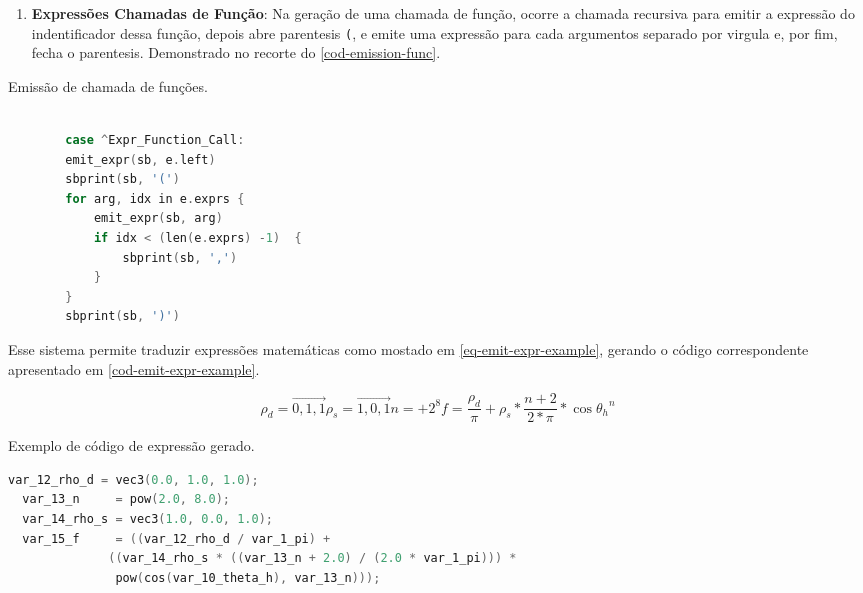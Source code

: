 \begin{enumerate}
    \item \textbf{Expressões Chamadas de Função}:
        Na geração de uma chamada de função, ocorre a chamada recursiva para emitir a expressão do indentificador dessa função, depois abre parentesis \verb"(", e emite uma expressão para cada argumentos separado por virgula e, por fim, fecha o parentesis. Demonstrado no recorte do \autoref{cod-emission-func}.

\end{enumerate}

\begin{codigo}[htb]
    \caption{\small Emissão de chamada de funções. }
    \label{cod-emission-func}
\begin{lstlisting}[language=C, frame=none, inputencoding=utf8]

        case ^Expr_Function_Call:
        emit_expr(sb, e.left)
        sbprint(sb, '(')
        for arg, idx in e.exprs {
            emit_expr(sb, arg)
            if idx < (len(e.exprs) -1)  {
                sbprint(sb, ',')
            }
        }
        sbprint(sb, ')')
\end{lstlisting}
\end{codigo}


 Esse sistema permite traduzir expressões matemáticas como mostado em \autoref{eq-emit-expr-example}, gerando o código correspondente apresentado em \autoref{cod-emit-expr-example}.

\begin{subequations}
\begin{equation}
    \rho_{d} = \vec{0,1,1}
\end{equation}

\begin{equation}
    \rho_{s} = \vec{1,0,1}
\end{equation}

\begin{equation}
    n = +2^8
\end{equation}

\begin{equation}
f = \frac{\rho_{d}}{\pi} + \rho_{s} * \frac{n+2}{2*\pi} *
\cos{\theta_{h}}^{n}
\end{equation}
\end{subequations}

\begin{codigo}[htb]
   \caption{\small Exemplo de código de expressão gerado. }
   \label{cod-emit-expr-example}
\begin{lstlisting}[language=C, frame=none, inputencoding=utf8]
  var_12_rho_d = vec3(0.0, 1.0, 1.0);
  var_13_n     = pow(2.0, 8.0);
  var_14_rho_s = vec3(1.0, 0.0, 1.0);
  var_15_f     = ((var_12_rho_d / var_1_pi) +
              ((var_14_rho_s * ((var_13_n + 2.0) / (2.0 * var_1_pi))) *
               pow(cos(var_10_theta_h), var_13_n)));
\end{lstlisting}
\end{codigo}

